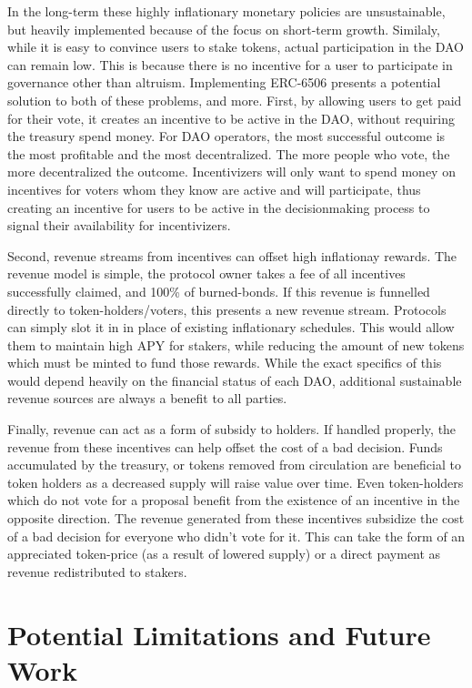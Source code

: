 \documentclass{article}
\begin{document}
In the long-term these highly inflationary monetary policies are unsustainable, but heavily implemented because of the focus on short-term growth. Similaly, while it is easy to convince users to stake tokens, actual participation in the DAO can remain low. This is because there is no incentive for a user to participate in governance other than altruism. Implementing ERC-6506 presents a potential solution to both of these problems, and more. First, by allowing users to get paid for their vote, it creates an incentive to be active in the DAO, without requiring the treasury spend money. For DAO operators, the most successful outcome is the most profitable and the most decentralized. The more people who vote, the more decentralized the outcome. Incentivizers will only want to spend money on incentives for voters whom they know are active and will participate, thus creating an incentive for users to be active in the decisionmaking process to signal their availability for incentivizers.

Second, revenue streams from incentives can offset high inflationay rewards. The revenue model is simple, the protocol owner takes a fee of all incentives successfully claimed, and 100\% of burned-bonds. If this revenue is funnelled directly to token-holders/voters, this presents a new revenue stream. Protocols can simply slot it in in place of existing inflationary schedules. This would allow them to maintain high APY for stakers, while reducing the amount of new tokens which must be minted to fund those rewards. While the exact specifics of this would depend heavily on the financial status of each DAO, additional sustainable revenue sources are always a benefit to all parties.

Finally, revenue can act as a form of subsidy to holders. If handled properly, the revenue from these incentives can help offset the cost of a bad decision. Funds accumulated by the treasury, or tokens removed from circulation are beneficial to token holders as a decreased supply will raise value over time. Even token-holders which do not vote for a proposal benefit from the existence of an incentive in the opposite direction. The revenue generated from these incentives subsidize the cost of a bad decision for everyone who didn't vote for it. This can take the form of an appreciated token-price (as a result of lowered supply) or a direct payment as revenue redistributed to stakers. 

\section{Potential Limitations and Future Work}
\end{document}
